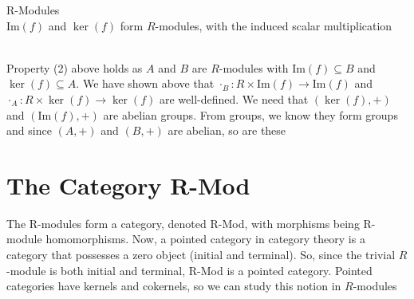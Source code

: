 \documentclass{report}
\begin{document}
\begin{lemma}{R-Modules}{}\\
    $\text{Im}(f)$ and $\ker (f)$ form $R$-modules, with the induced scalar multiplication
\end{lemma}
\begin{prf}{}{}\\
    Property (2) above holds as $A$ and $B$ are $R$-modules with $\text{Im}(f) \subseteq B$ and $\ker (f) \subseteq A$. We have shown above that  $\cdot_B :R\times \text{Im}(f) \to \text{Im}(f)$ and $\cdot _A:R \times \ker (f)\to \ker (f)$ are well-defined. We need that $(\ker (f), +)$ and $(\text{Im}(f), +)$ are abelian groups. From groups, we know they form groups and since $(A,+)$ and $(B, +)$ are abelian, so are these
\end{prf}


\section{The Category R-Mod}
The R-modules form a category, denoted R-Mod, with morphisms being R-module homomorphisms. Now, a pointed category in category theory is a category that possesses a zero object (initial and terminal). So, since the trivial $R$-module is both initial and terminal, R-Mod is a pointed category. Pointed categories have kernels and cokernels, so we can study this notion in $R$-modules
\end{document}
